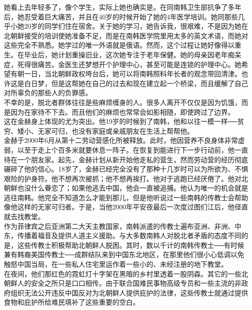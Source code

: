 \begin{multicols}{\theparacolNo}
她看上去年轻多了，像个学生，实际上她也确实是。在同南韩卫生部抗争了多年后，她忍受着巨大痛苦，并且在40岁的时候开始了她的4年医学培训。她同那些几乎小她20岁的同学们住在宿舍。关于她的学习，她告诉我，很艰难，不是因为她在北朝鲜接受的培训使她准备不足，而是在南韩医学院里用太多的英文术语，而她对这些完全不熟悉。她学过的唯一外语就是俄语。然而，这个过程让她好像得以重生。在毕业后，她计划重操旧业，这次她专注于老年保健。她的母亲因老年痴呆症，死得很痛苦。金医生还梦想开个护理中心，甚至可能是连锁的护理中心。她希望有朝一日，当北朝鲜政权垮台后，她可以将南韩照料年长者的观念带回清津。也许这是白日梦，但是这帮她在自己的过去和现在建立起一个桥梁，而且缓解了自己对所辜负的那些人的负罪感。\\

不幸的是，脱北者群体往往是些麻烦缠身的人。很多人离开不仅仅是因为饥饿，而是因为在家待不下去。而且他们的麻烦也常常会如影相随，即使跨过了边界。\\

这在金赫身上体现的尤为突出。他19岁的时候到了南韩，他和以往一模一样──贫穷、矮小、无家可归，也没有家庭或亲戚朋友在生活上帮帮他。\\

金赫于2000年6月从第十二劳动营感化所被释放。此时，他因营养不良身体非常虚弱，以至于走上个百多米就要休息一阵子。在恢复到能进行下一步行动前，他一直待在一个朋友家。起先，金赫计划从新开始他走私的营生，然而劳动营的经历彻底碾碎了他的信心。18岁了，金赫已经完全没有了那种十几岁时可以为所欲为、不惧艰险的护身符。他不想再次被抓；他不想再挨打。他对于逃跑已经厌倦了。他对北朝鲜也没什么眷恋了；如果他逃去中国，他会一直被追捕。他认为唯一的机会就是逃往南韩。他完全不知道怎么才能到那儿，但是他听说过一些南韩的传教士会帮助像他这样的无家可归者。于是，当他2000年平安夜最后一次度过图们江后，他径直就去找教堂。\\

作为菲律宾之后亚洲第二大天主教国家，南韩派遣的传教士遍布亚洲、非洲、中东，传播着福音及提供人道主义援助。与大多数南韩人对脱北者矛盾的态度不同的是，这些传教士积极帮助北朝鲜人脱困。其时，数以千计的南韩传教士──有时候兼有韩裔美国传教士──成群结队来到中国东北地区，在那里他们很小心低调以免触怒中国当局，在一些私人住宅里运作着一些小的、未经注册的地下教堂。\\

在夜间，他们那红色的霓虹灯十字架在黑暗的乡村里透着一股阴森。其它的一些北朝鲜人的安全之所只是口口相传。由于联合国难民事物高级专员和一些主流的非政府组织无法公开违反中国反对为北朝鲜人提供庇护的法律，这些传教士就通过提供食物和庇护所给难民填补了这些重要的空白。\\


\end{multicols}
